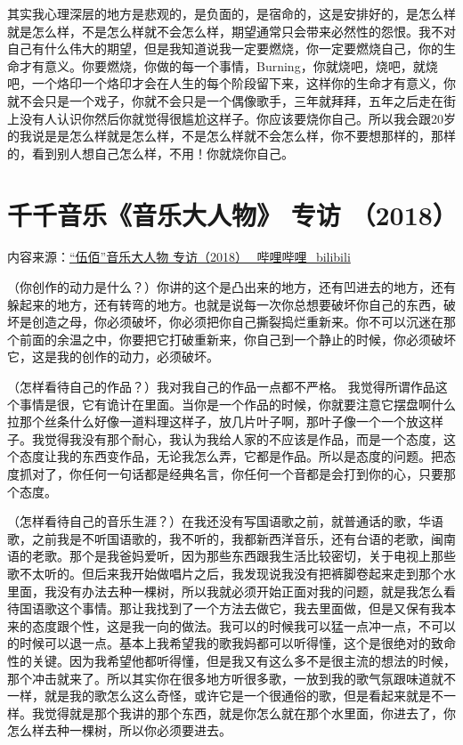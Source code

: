 \documentclass[UTF8,a4paper,oneside,twocolumn,12pt]{ctexbook}
\begin{document}
其实我心理深层的地方是悲观的，是负面的，是宿命的，这是安排好的，是怎么样就是怎么样，不是怎么样就不会怎么样，期望通常只会带来必然性的怨恨。我不对自己有什么伟大的期望，但是我知道说我一定要燃烧，你一定要燃烧自己，你的生命才有意义。你要燃烧，你做的每一个事情，Burning，你就烧吧，烧吧，就烧吧，一个烙印一个烙印才会在人生的每个阶段留下来，这样你的生命才有意义，你就不会只是一个戏子，你就不会只是一个偶像歌手，三年就拜拜，五年之后走在街上没有人认识你然后你就觉得很尴尬这样子。你应该要烧你自己。所以我会跟20岁的我说是是怎么样就是怎么样，不是怎么样就不会怎么样，你不要想那样的，那样的，看到别人想自己怎么样，不用！你就烧你自己。

\section{千千音乐《音乐大人物》 专访 （2018）}
内容来源：\href{https://www.bilibili.com/video/BV1o7411H7eK?vd_source=b28d2965994146c1572f764754540d4a}{“伍佰”音乐大人物 专访（2018）\_哔哩哔哩\_bilibili}

（你创作的动力是什么？）你讲的这个是凸出来的地方，还有凹进去的地方，还有躲起来的地方，还有转弯的地方。也就是说每一次你总想要破坏你自己的东西，破坏是创造之母，你必须破坏，你必须把你自己撕裂捣烂重新来。你不可以沉迷在那个前面的余温之中，你要把它打破重新来，你自己到一个静止的时候，你必须破坏它，这是我的创作的动力，必须破坏。

（怎样看待自己的作品？）我对我自己的作品一点都不严格。
我觉得所谓作品这个事情是很，它有诡计在里面。当你是一个作品的时候，你就要注意它摆盘啊什么拉那个丝条什么好像一道料理这样子，放几片叶子啊，那叶子像一个一个放这样子。我觉得我没有那个耐心，我认为我给人家的不应该是作品，而是一个态度，这个态度让我的东西变作品，无论我怎么弄，它都是作品。所以是态度的问题。把态度抓对了，你任何一句话都是经典名言，你任何一个音都是会打到你的心，只要那个态度。

（怎样看待自己的音乐生涯？）在我还没有写国语歌之前，就普通话的歌，华语歌，之前我是不听国语歌的，我不听的，我都新西洋音乐，还有台语的老歌，闽南语的老歌。那个是我爸妈爱听，因为那些东西跟我生活比较密切，关于电视上那些歌不太听的。但后来我开始做唱片之后，我发现说我没有把裤脚卷起来走到那个水里面，我没有办法去种一棵树，所以我就必须开始正面对我的问题，就是我怎么看待国语歌这个事情。那让我找到了一个方法去做它，我去里面做，但是又保有我本来的态度跟个性，这是我一向的做法。我可以的时候我可以猛一点冲一点，不可以的时候可以退一点。基本上我希望我的歌我妈都可以听得懂，这个是很绝对的致命性的关键。因为我希望他都听得懂，但是我又有这么多不是很主流的想法的时候，那个冲击就来了。所以其实你在很多地方听很多歌，一放到我的歌气氛跟味道就不一样，就是我的歌怎么这么奇怪，或许它是一个很通俗的歌，但是看起来就是不一样。我觉得就是那个我讲的那个东西，就是你怎么就在那个水里面，你进去了，你怎么样去种一棵树，所以你必须要进去。
\end{document}
